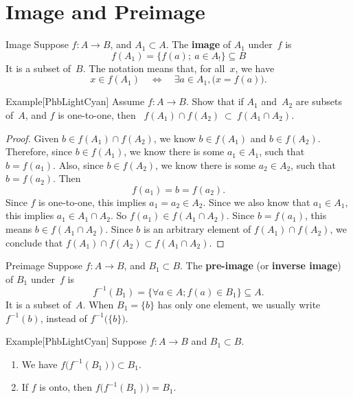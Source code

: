 \documentclass[../MATH-2000-Notes.tex]{subfiles}
\begin{document}
\section{Image and Preimage}
\begin{Definition}
    {Image}
    Suppose $f \colon A \to B$, and $A_1 \subset A$. The \textbf{image} of $A_1$ under~$f$ is
    $$ f(A_1) = \{f(a);\ a\in A_!\} \subseteq B $$
    It is a subset of~$B$. The notation means that, for all~$x$, we have
    $$ x \in f(A_1) \quad \Leftrightarrow \quad \exists a \in A_1, \bigl( x = f(a) \bigr) .$$
\end{Definition}
\begin{commentbox}{Example}[{PhbLightCyan}]
    Assume $f \colon A \to B$.
    Show that if $A_1$ and~$A_2$ are subsets of~$A$, and $f$ is one-to-one, then \  $f(A_1) \cap f(A_2) \ \subset \ f(A_1 \cap A_2)$.
\end{commentbox}
\begin{proof}
    Given $b \in f(A_1) \cap f(A_2)$, we know $b \in f(A_1)$ and $b \in f(A_2)$. Therefore, since $b \in f(A_1)$, we know there is some $a_1 \in A_1$, such that $b = f(a_1)$. Also, since $b \in f(A_2)$, we know there is some $a_2 \in A_2$, such that $b = f(a_2)$. Then
    $$ f(a_1) = b = f(a_2) .$$
    Since $f$ is one-to-one, this implies $a_1 = a_2 \in A_2$. Since we also know that $a_1 \in A_1$, this implies $a_1 \in A_1 \cap A_2$. So $f(a_1) \in f(A_1 \cap A_2)$. Since $b = f(a_1)$, this means $b \in f(A_1 \cap A_2)$. Since $b$ is an arbitrary element of $f(A_1) \cap f(A_2)$, we conclude that $f(A_1) \cap f(A_2) \subset f(A_1 \cap A_2)$.
\end{proof}
\begin{Definition}
    {Preimage}
    Suppose $f \colon A \to B$, and $B_1 \subset B$. The \textbf{pre-image} (or \textbf{inverse image}) of $B_1$ under~$f$ is
    $$ f^{-1}(B_1) = \{\forall a\in A; f(a) \in B_1\} \subseteq A.$$
    It is a subset of~$A$. When $B_1 = \{b\}$ has only one element, we usually write $f^{-1}(b)$, instead of $f^{-1} \bigl( \{b\} \bigr)$.
\end{Definition}

\begin{commentbox}{Example}[{PhbLightCyan}]
    Suppose $f \colon A \to B$ and $B_1 \subset B$.
    \begin{multicols}{2}
        \begin{enumerate}
            \item \label{InvImgContainEg-f(f(B1))inB1}
                  We have $f \bigl( f^{-1}(B_1) \bigr) \subset B_1$.
            \item \label{InvImgContainEg-f(f(B1))=B1}
                  If $f$ is onto, then $f \bigl( f^{-1}(B_1) \bigr) = B_1$.
        \end{enumerate}
    \end{multicols}
\end{commentbox}
\end{document}
